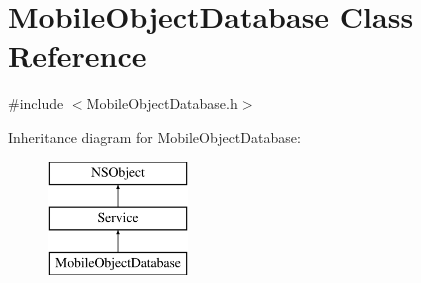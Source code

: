 \hypertarget{interface_mobile_object_database}{
\section{\-Mobile\-Object\-Database \-Class \-Reference}
\label{interface_mobile_object_database}
}


{\ttfamily \#include $<$\-Mobile\-Object\-Database.\-h$>$}

\-Inheritance diagram for \-Mobile\-Object\-Database\-:\begin{figure}[H]
\begin{center}
\leavevmode
\includegraphics[height=3.000000cm]{interface_mobile_object_database}
\end{center}
\end{figure}
